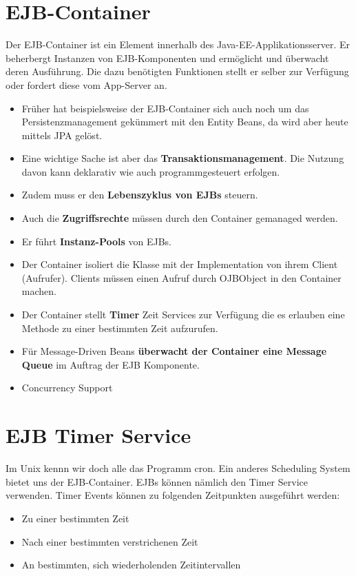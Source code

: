 \section{EJB-Container}
Der EJB-Container ist ein Element innerhalb des Java-EE-Applikationsserver. Er beherbergt Instanzen von EJB-Komponenten und ermöglicht und überwacht deren Ausführung. Die dazu benötigten Funktionen stellt er selber zur Verfügung oder fordert diese vom App-Server an.

\begin{itemize}
	\item Früher hat beispielsweise der EJB-Container sich auch noch um das Persistenzmanagement gekümmert mit den Entity Beans, da wird aber heute mittels JPA gelöst.
	\item Eine wichtige Sache ist aber das \textbf{Transaktionsmanagement}.  Die Nutzung davon kann deklarativ wie auch programmgesteuert erfolgen.
	\item Zudem muss er den \textbf{Lebenszyklus von EJBs} steuern.
	\item Auch die \textbf{Zugriffsrechte} müssen durch den Container gemanaged werden.
	\item Er führt \textbf{Instanz-Pools} von EJBs.
	\item Der Container isoliert die Klasse mit der Implementation von ihrem Client (Aufrufer). Clients müssen einen Aufruf durch OJBObject in den Container machen.
	\item Der Container stellt \textbf{Timer} Zeit Services zur Verfügung die es erlauben eine Methode zu einer bestimmten Zeit aufzurufen.
	\item Für Message-Driven Beans\textbf{ überwacht der Container eine Message Queue }im  Auftrag der EJB Komponente. 
	\item Concurrency Support 
\end{itemize}

\section{EJB Timer Service}
Im Unix kennn wir doch alle das Programm cron. Ein anderes Scheduling System bietet uns der EJB-Container. EJBs können nämlich den Timer Service verwenden. Timer Events können zu folgenden Zeitpunkten ausgeführt werden:
\begin{itemize}
\item Zu einer bestimmten Zeit 
\item Nach einer bestimmten verstrichenen Zeit 
\item An bestimmten, sich wiederholenden Zeitintervallen 
\end{itemize}	

